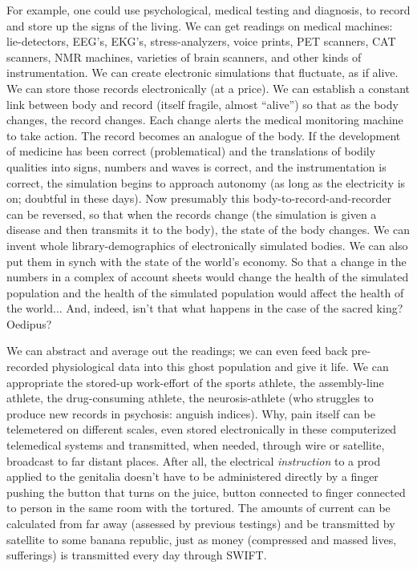For example, one could use psychological, medical testing and diagnosis, to record and store up the signs of the living. We can get readings on medical machines: lie-detectors, EEG's, EKG's, stress-analyzers, voice prints, PET scanners, CAT scanners, NMR machines, varieties of brain scanners, and other kinds of instrumentation. We can create electronic simulations that fluctuate, as if alive. We can store those records electronically (at a price). We can establish a constant link between body and record (itself fragile, almost \enquote{alive}) so that as the body changes, the record changes. Each change alerts the medical monitoring machine to take action. The record becomes an analogue of the body. If the development of medicine has been correct (problematical) and the translations of bodily qualities into signs, numbers and waves is correct, and the instrumentation is correct, the simulation begins to approach autonomy (as long as the electricity is on; doubtful in these days). Now presumably this body-to-record-and-recorder can be reversed, so that when the records change (the simulation is given a disease and then transmits it to the body), the state of the body changes. We can invent whole library-demographics of electronically simulated bodies. We can also put them in synch with the state of the world's economy. So that a change in the numbers in a complex of account sheets would change the health of the simulated population and the health of the simulated population would affect the health of the world... And, indeed, isn't that what happens in the case of the sacred king? Oedipus?

We can abstract and average out the readings; we can even feed back pre-recorded physiological data into this ghost population and give it life. We can appropriate the stored-up work-effort of the sports athlete, the assembly-line athlete, the drug-consuming athlete, the neurosis-athlete (who struggles to produce new records in psychosis: anguish indices). Why, pain itself can be telemetered on different scales, even stored electronically in these computerized telemedical systems and transmitted, when needed, through wire or satellite, broadcast to far distant places. After all, the electrical \emph{instruction} to a prod applied to the genitalia doesn't have to be administered directly by a finger pushing the button that turns on the juice, button connected to finger connected to person in the same room with the tortured. The amounts of current can be calculated from far away (assessed by previous testings) and be transmitted by satellite to some banana republic, just as money (compressed and massed lives, sufferings) is transmitted every day through SWIFT.

